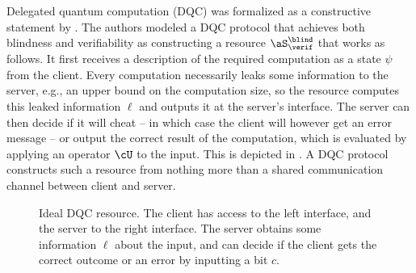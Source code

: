 Delegated quantum computation (DQC) was formalized as a constructive
statement by \textcite{DFPR14}. The authors modeled a DQC protocol
that achieves both blindness and verifiability as constructing a
resource $\aS^{\blind}_{\verif}$ that works as follows. It first
receives a description of the required computation as a state $\psi$
from the client. Every computation necessarily leaks some information
to the server, e.g., an upper bound on the computation size, so the
resource computes this leaked information $\ell$ and outputs it at the
server's interface. The server can then decide if it will cheat \---
in which case the client will however get an error message \--- or
output the correct result of the computation, which is evaluated by
applying an operator $\cU$ to the input. This is depicted in
. A DQC protocol constructs such a resource from
nothing more than a shared communication channel between client and
server.

\begin{figure}[tb]


\caption[Ideal DQC resources]{\label{fig:dqc.ideal}Ideal DQC
  resource. The client has access to the left interface, and the
  server to the right interface. The server obtains some information
  $\ell$ about the input, and can decide if the client gets the
  correct outcome or an error by inputting a bit $c$.}
\end{figure}

